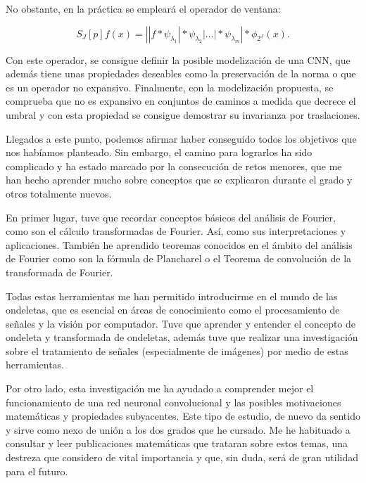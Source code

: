 \medskip

\noindent No obstante, en la práctica se empleará el operador de ventana:

\begin{equation}
  S_J[p]f(x)=\left| |f \ast \psi_{\lambda_1} | \ast \psi_{\lambda_2} | \ldots | \ast \psi_{\lambda_m} \right| \ast \phi_{2^J}(x).
\end{equation}

\noindent Con este operador, se consigue definir la posible modelización de una CNN, que además tiene unas propiedades deseables como la preservación de la norma o que es un operador no expansivo. Finalmente, con la modelización propuesta, se comprueba que no es expansivo en conjuntos de caminos a medida que decrece el umbral y con esta propiedad se consigue demostrar su invarianza por traslaciones.

\medskip

\noindent Llegados a este punto, podemos afirmar haber conseguido todos los objetivos que nos habíamos planteado. Sin embargo, el camino para lograrlos ha sido complicado y ha estado marcado por la consecución de retos menores, que me han hecho aprender mucho sobre conceptos que se explicaron durante el grado y otros totalmente nuevos.

\medskip

\noindent En primer lugar, tuve que recordar conceptos básicos del análisis de Fourier, como son el cálculo transformadas de Fourier. Así, como sus interpretaciones y aplicaciones. También he aprendido teoremas conocidos en el ámbito del análisis de Fourier como son la fórmula de Plancharel o el Teorema de convolución de la transformada de Fourier. 

\medskip

\noindent Todas estas herramientas me han permitido introducirme en el mundo de las ondeletas, que es esencial en áreas de conocimiento como el procesamiento de señales y la visión por computador. Tuve que aprender y entender el concepto de ondeleta y transformada de ondeletas, además tuve que realizar una investigación sobre el tratamiento de señales (especialmente de imágenes) por medio de estas herramientas.

\medskip

\noindent Por otro lado, esta investigación me ha ayudado a comprender mejor el funcionamiento de una red neuronal convolucional y las posibles motivaciones matemáticas y propiedades subyacentes. Este tipo de estudio, de nuevo da sentido y sirve como nexo de unión a los dos grados que he cursado. Me he habituado a consultar y leer publicaciones matemáticas que trataran sobre estos temas, una destreza que considero de vital importancia y que, sin duda, será de gran utilidad para el futuro.


